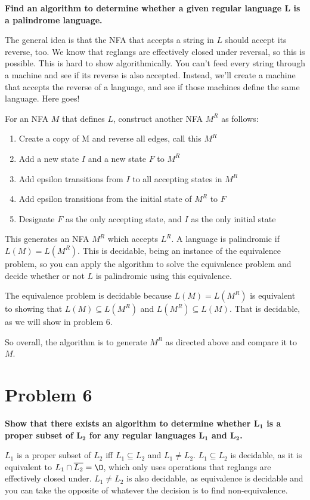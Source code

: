 \documentclass{report}
\begin{document}
\textbf{Find an algorithm to determine whether a given regular language $\mathbf{L}$ is a palindrome language.}

The general idea is that the NFA that accepts a string in $L$ should accept its reverse, too. We know that reglangs are effectively closed under reversal, so this is possible. This is hard to show algorithmically. You can't feed every string through a machine and see if its reverse is also accepted. Instead, we'll create a machine that accepts the reverse of a language, and see if those machines define the same language. Here goes!

For an NFA $M$ that defines $L$, construct another NFA $M^R$ as follows:
\begin{enumerate}
	\item Create a copy of M and reverse all edges, call this $M^R$
	\item Add a new state $I$ and a new state $F$ to $M^R$
	\item Add epsilon transitions from $I$ to all accepting states in $M^R$
	\item Add epsilon transitions from the initial state of $M^R$ to $F$ 
	\item Designate $F$ as the only accepting state, and $I$ as the only initial state
\end{enumerate}

This generates an NFA $M^R$ which accepts $L^R$. A language is palindromic if $L(M) = L(M^R)$. This is decidable, being an instance of the equivalence problem, so you can apply the algorithm to solve the equivalence problem and decide whether or not $L$ is palindromic using this equivalence.

The equivalence problem is decidable because $L(M) = L(M^R)$ is equivalent to showing that $L(M) \subseteq L(M^R)$ and   $L(M^R) \subseteq L(M)$.
That is decidable, as we will show in problem 6.

So overall, the algorithm is to generate $M^R$ as directed above and compare it to $M$.

\section*{Problem 6}
\textbf{Show that there exists an algorithm to determine whether $\mathbf{L_1}$ is a proper subset of $\mathbf{L_2}$ for any regular languages $\mathbf{L_1}$ and $\mathbf{L_2}$.}

$L_1$ is a proper subset of $L_2$ iff $L_1 \subseteq L_2$ and $L_1 \neq L_2$. $L_1 \subseteq L_2$ is decidable, as it is equivalent to $L_1 \cap \overline{L_2} = \O$, which only uses operations that reglangs are effectively closed under. $L_1 \neq L_2$ is also decidable, as equivalence is decidable and you can take the opposite of whatever the decision is to find non-equivalence.
\end{document}
